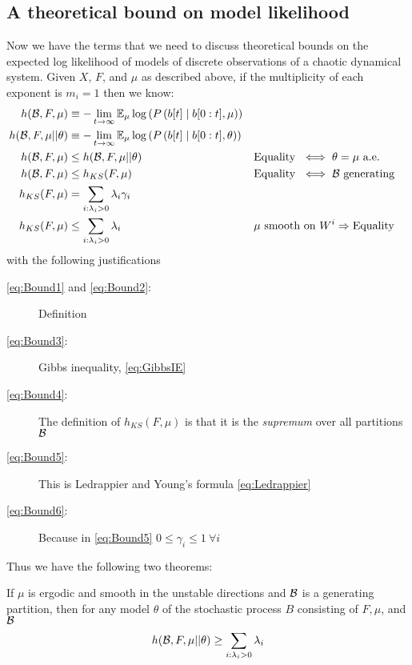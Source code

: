 \subsection{A theoretical bound on model likelihood}
\label{sec:TheoreticalBound}

Now we have the terms that we need to discuss theoretical bounds on
the expected log likelihood of models of discrete observations of a
chaotic dynamical system.  Given $X$, $F$, and $\mu$ as described
above, if the multiplicity of each exponent is $m_i = 1$ then we know:
\begin{align}
  \label{eq:Bound1}
  h({\cal{B}},F,\mu) &\equiv - \lim_{t \rightarrow
    \infty} \EV_\mu \log \left( P \left( \ti{b}{t}\given \ts{b}{0}{t}, \mu
    \right) \right) \\
  \label{eq:Bound2}
  h({\cal{B}},F,\mu||\theta) &\equiv - \lim_{t \rightarrow \infty}
  \EV_\mu \log \left( P \left( \ti{b}{t}\given \ts{b}{0}{t}, \theta
    \right) \right) \\
  \label{eq:Bound3}
  h({\cal{B}},F,\mu) &\leq h({\cal{B}},F,\mu||\theta)  &&
  \text{Equality } \iff \theta = \mu \text{ a.e.}\\
  \label{eq:Bound4}
  h({\cal{B}},F,\mu) &\leq h_{KS}(F,\mu)  &&
  \text{Equality } \iff {\cal{B}} \text{ generating} \\
  \label{eq:Bound5}
  h_{KS}(F,\mu) &= \sum_{i : \lambda_i > 0} \lambda_i \gamma_i\\
  \label{eq:Bound6}
  h_{KS}(F,\mu) &\leq \sum_{i : \lambda_i > 0} \lambda_i && \mu \text{
  smooth on } W^i \Rightarrow \text{Equality}
\end{align}
with the following justifications
\begin{description}
\item[\eqref{eq:Bound1} {\mdseries and} \eqref{eq:Bound2}:] Definition
\item[\eqref{eq:Bound3}:] Gibbs inequality, \eqref{eq:GibbsIE}
\item[\eqref{eq:Bound4}:] The definition of $h_{KS}(F,\mu)$ is that it is the
  \emph{supremum} over all partitions ${\cal{B}}$
\item[\eqref{eq:Bound5}:] This is Ledrappier and Young's formula
  \eqref{eq:Ledrappier}
\item[\eqref{eq:Bound6}:] Because in \eqref{eq:Bound5} $0 \leq \gamma_i \leq
  1~ \forall i$
\end{description}
Thus we have the following two theorems:
\begin{theorem}
  If $\mu$ is ergodic and smooth in the unstable directions and
  $\cal{B}$ is a generating partition, then for any model $\theta$ of
  the stochastic process $B$ consisting of $F,\mu$, and $\cal{B}$
  \begin{equation}
    \label{eq:BoundTheorem}
    h({\cal{B}},F,\mu||\theta) \geq \sum_{i : \lambda_i > 0} \lambda_i
  \end{equation}
\end{theorem}

